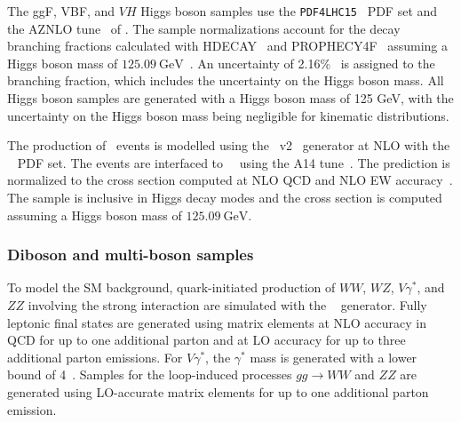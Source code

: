 The ggF, VBF, and $VH$ Higgs boson samples use the \texttt{PDF4LHC15}~\cite{Butterworth:2015oua} PDF set and the AZNLO tune~\cite{STDM-2012-23} of . The sample normalizations account for the decay branching fractions calculated with \textsc{HDECAY}~\cite{Djouadi:1997yw, Spira:1997dg, Djouadi:2006bz} and \textsc{PROPHECY4F}~\cite{Bredenstein:2006ha, Bredenstein:2006rh, Bredenstein:2006nk} assuming a Higgs boson mass of $\SI{125.09}{\GeV}$~\cite{HIGG-2014-14}. An uncertainty of 2.16\%~\cite{deFlorian:2016spz} is assigned to the \hww branching fraction, which includes the uncertainty on the Higgs boson mass. All Higgs boson samples are generated with a Higgs boson mass of 125 GeV, with the uncertainty on the Higgs boson mass being negligible for kinematic distributions.

The production of \ttH\ events is modelled using the \powhegbox~v2~\cite{Frixione:2007nw,Nason:2004rx,Frixione:2007vw,Alioli:2010xd,Hartanto:2015uka} generator at NLO with the \nnpdfnlo~\cite{Ball:2014uwa} PDF set.
The events are interfaced to ~\cite{Sjostrand:2014zea}~using the A14 tune~\cite{ATL-PHYS-PUB-2014-021}.
The prediction is normalized to the cross section computed at NLO QCD and NLO EW accuracy~\cite{deFlorian:2016spz}.
The sample is inclusive in Higgs decay modes and the cross section is computed assuming a Higgs boson mass of $\SI{125.09}{\GeV}$.


\subsubsection{Diboson and multi-boson samples}

To model the SM background, quark-initiated production of $WW$, $WZ$, $V\gamma^{\ast}$, and $ZZ$ involving the strong interaction are simulated with the ~\cite{Bothmann:2019yzt} generator.
Fully leptonic final states are generated using matrix elements at NLO accuracy in QCD for up to one additional parton and at LO accuracy for up to three additional parton emissions.
For $V\gamma^{\ast}$, the $\gamma^{\ast}$ mass is generated with a lower bound of 4~\GeV.
Samples for the loop-induced processes $gg \to WW$ and $ZZ$ are generated using LO-accurate matrix elements for up to one additional parton emission.

